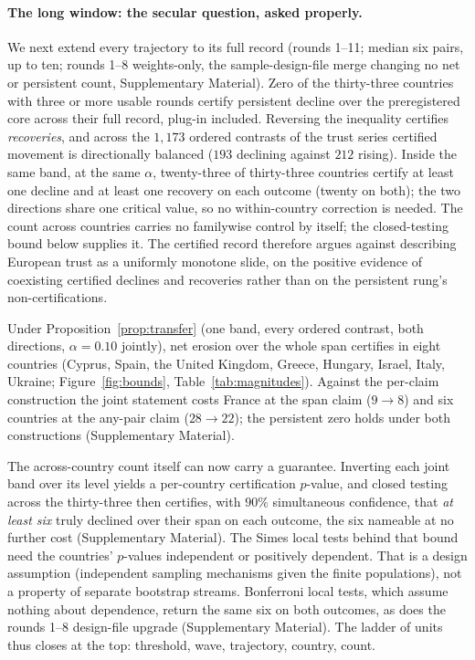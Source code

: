 \paragraph{The long window: the secular question, asked properly.} We next
extend every trajectory to its full record (rounds 1--11; median six pairs,
up to ten; rounds 1--8 weights-only, the sample-design-file merge changing
no net or persistent count, Supplementary Material). Zero of the
thirty-three countries with three or more usable rounds certify persistent
decline over the preregistered core across their full record, plug-in
included. Reversing the inequality certifies \emph{recoveries}, and across
the $1{,}173$ ordered contrasts of the trust series certified movement is
directionally balanced ($193$ declining against $212$ rising). Inside the
same band, at the same $\alpha$, twenty-three of thirty-three countries
certify at least one decline and at least one recovery on each outcome
(twenty on both); the two directions share one critical value, so no
within-country correction is needed. The count across countries carries no
familywise control by itself; the closed-testing bound below supplies it. The
certified record therefore argues against describing European trust as a
uniformly monotone slide, on the positive evidence of coexisting certified
declines and recoveries rather than on the persistent rung's
non-certifications.

Under Proposition~\ref{prop:transfer} (one band, every ordered contrast,
both directions, $\alpha=0.10$ jointly), net erosion over the
whole span certifies in eight countries (Cyprus, Spain, the United Kingdom,
Greece, Hungary, Israel, Italy, Ukraine; Figure~\ref{fig:bounds},
Table~\ref{tab:magnitudes}). Against the per-claim construction the joint
statement costs France at the span claim ($9\to8$) and six countries at the
any-pair claim ($28\to22$); the persistent zero holds under both
constructions (Supplementary Material).

The across-country count itself can now carry a guarantee. Inverting each
joint band over its level yields a per-country certification $p$-value, and
closed testing across the thirty-three \citep{goeman2011multiple} then
certifies, with $90\%$ simultaneous confidence, that \emph{at least six}
truly declined over their span on each outcome, the six nameable at no
further cost (Supplementary Material). The Simes local tests behind that
bound need the countries' $p$-values independent or positively dependent. That is a design assumption (independent sampling mechanisms given the
finite populations), not a property of separate bootstrap streams. Bonferroni local tests, which assume nothing about
dependence, return the same six on both outcomes, as does the rounds 1--8
design-file upgrade (Supplementary Material). The ladder of units thus
closes at the top: threshold, wave, trajectory, country, count.

